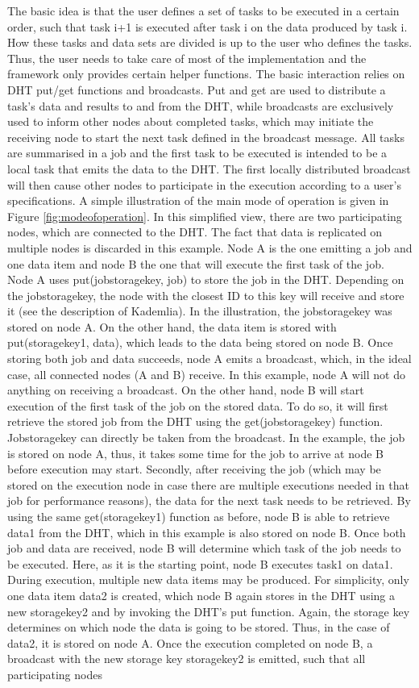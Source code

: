 The basic idea is that the user defines a set of tasks to be executed in a certain order, such that task i+1 is executed after task i on the data produced by task i. How these tasks and data sets are divided is up to the user who defines the tasks. Thus, the user needs to take care of most of the implementation and the framework only provides certain helper functions. The basic interaction relies on DHT put/get functions and broadcasts. Put and get are used to distribute a task's data and results to and from the DHT, while broadcasts are exclusively used to inform other nodes about completed tasks, which may initiate the receiving node to start the next task defined in the broadcast message. All tasks are summarised in a job and the first task to be executed is intended to be a local task that emits the data to the DHT. The first locally distributed broadcast will then cause other nodes to participate in the execution according to a user's specifications. A simple illustration of the main mode of operation is given in Figure \ref{fig:modeofoperation}. In this simplified view, there are two participating nodes, which are connected to the DHT. The fact that data is replicated on multiple nodes is discarded in this example. Node A is the one emitting a job and one data item and node B the one that will execute the first task of the job. Node A uses put(jobstoragekey, job) to store the job in the DHT. Depending on the jobstoragekey, the node with the closest ID to this key will receive and store it (see the description of Kademlia). In the illustration, the jobstoragekey was stored on node A. On the other hand, the data item is stored with put(storagekey1, data), which leads to the data being stored on node B. Once storing both job and data succeeds, node A emits a broadcast, which, in the ideal case, all connected nodes (A and B) receive. In this example, node A will not do anything on receiving a broadcast. On the other hand, node B will start execution of the first task of the job on the stored data. To do so, it will first retrieve the stored job from the DHT using the get(jobstoragekey) function. Jobstoragekey can directly be taken from the broadcast. In the example, the job is stored on node A, thus, it takes some time for the job to arrive at node B before execution may start. Secondly, after receiving the job (which may be stored on the execution node in case there are multiple executions needed in that job for performance reasons), the data for the next task needs to be retrieved. By using the same get(storagekey1) function as before, node B is able to retrieve data1 from the DHT, which in this example is also stored on node B. Once both job and data are received, node B will determine which task of the job needs to be executed. Here, as it is the starting point, node B executes task1 on data1. During execution, multiple new data items may be produced. For simplicity, only one data item data2 is created, which node B again stores in the DHT using a new storagekey2 and by invoking the DHT's put function. Again, the storage key determines on which node the data is going to be stored. Thus, in the case of data2, it is stored on node A. Once the execution completed on node B, a broadcast with the new storage key storagekey2 is emitted, such that all participating nodes 